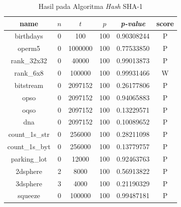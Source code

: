 \documentclass[conference]{IEEEtran}
\newcommand{\en}[1]
    {\foreignlanguage{english}{\textit{#1}}}
\begin{document}
\begin{table}[htbp]
    \caption{Hasil  pada Algoritma \en{Hash} SHA-1}
    \label{tab:analisis:res-sha1}
    \begin{center}
        \begin{tabular}{|c|c|c|c|c|c|}
            \hline
            \textbf{name}  & \textbf{$n$} & \textbf{$t$} & \textbf{$p$} & \textbf{\en{p-value}} & \textbf{score} \\
            \hline
            birthdays      & 0            & 100          & 100          & 0.90308244            & P              \\
            operm5         & 0            & 1000000      & 100          & 0.77533850            & P              \\
            rank\_32x32    & 0            & 40000        & 100          & 0.99013873            & P              \\
            rank\_6x8      & 0            & 100000       & 100          & 0.99931466            & W              \\
            bitstream      & 0            & 2097152      & 100          & 0.26177806            & P              \\
            opso           & 0            & 2097152      & 100          & 0.94065883            & P              \\
            oqso           & 0            & 2097152      & 100          & 0.13229571            & P              \\
            dna            & 0            & 2097152      & 100          & 0.10089652            & P              \\
            count\_1s\_str & 0            & 256000       & 100          & 0.28211098            & P              \\
            count\_1s\_byt & 0            & 256000       & 100          & 0.13779757            & P              \\
            parking\_lot   & 0            & 12000        & 100          & 0.92463763            & P              \\
            2dsphere       & 2            & 8000         & 100          & 0.56913822            & P              \\
            3dsphere       & 3            & 4000         & 100          & 0.21190329            & P              \\
            squeeze        & 0            & 100000       & 100          & 0.99487181            & P              \\

\end{tabular}
\end{center}
\end{table}
\end{document}

